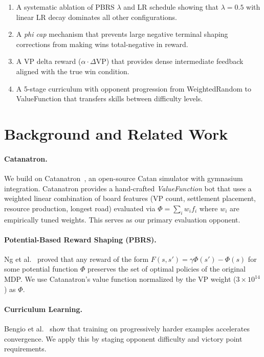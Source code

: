 \documentclass[10pt,twocolumn]{article}
\begin{document}
\begin{enumerate}
  \item A systematic ablation of PBRS $\lambda$ and LR schedule showing that
        $\lambda{=}0.5$ with linear LR decay dominates all other configurations.
  \item A \emph{phi cap} mechanism that prevents large negative terminal
        shaping corrections from making wins total-negative in reward.
  \item A VP delta reward ($\alpha \cdot \Delta\text{VP}$) that provides dense
        intermediate feedback aligned with the true win condition.
  \item A 5-stage curriculum with opponent progression from WeightedRandom to
        ValueFunction that transfers skills between difficulty levels.
\end{enumerate}

\section{Background and Related Work}

\paragraph{Catanatron.}
We build on Catanatron~\cite{collazo2021catanatron}, an open-source Catan
simulator with gymnasium integration. Catanatron provides a hand-crafted
\emph{ValueFunction} bot that uses a weighted linear combination of board
features (VP count, settlement placement, resource production, longest road)
evaluated via $\Phi = \sum_i w_i f_i$ where $w_i$ are empirically tuned
weights. This serves as our primary evaluation opponent.

\paragraph{Potential-Based Reward Shaping (PBRS).}
Ng et al.~\cite{ng1999policy} proved that any reward of the form
$F(s,s') = \gamma \Phi(s') - \Phi(s)$ for some potential function $\Phi$
preserves the set of optimal policies of the original MDP. We use Catanatron's
value function normalized by the VP weight ($3 \times 10^{14}$) as $\Phi$.

\paragraph{Curriculum Learning.}
Bengio et al.~\cite{bengio2009curriculum} show that training on progressively
harder examples accelerates convergence. We apply this by staging opponent
difficulty and victory point requirements.
\end{document}
